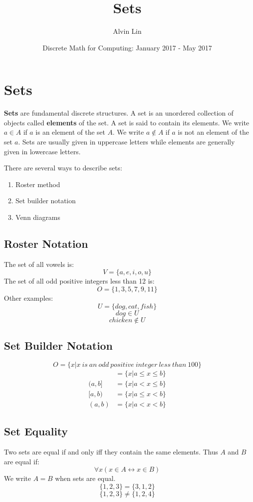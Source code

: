 \documentclass[letterpaper, 12pt]{math}
\title{Sets}
\author{Alvin Lin}
\date{Discrete Math for Computing: January 2017 - May 2017}
\begin{document}
\maketitle

\section*{Sets}
\textbf{Sets} are fundamental discrete structures. A set is an unordered
collection of objects called \textbf{elements} of the set. A set is said
to contain its elements. We write \( a \in A \) if \( a \) is an element of the
set \( A \). We write \( a \notin A \) if \( a \) is not an element of the set
\( a \). Sets are usually given in uppercase letters while elements are
generally given in lowercase letters. \par
There are several ways to describe sets:
\begin{enumerate}
  \item Roster method
  \item Set builder notation
  \item Venn diagrams
\end{enumerate}

\subsection*{Roster Notation}
The set of all vowels is:
\[ V = \bigg\{a,e,i,o,u\bigg\} \]
The set of all odd positive integers less than 12 is:
\[ O = \bigg\{1,3,5,7,9,11\bigg\} \]
Other examples:
\[ U = \bigg\{dog,cat,fish\bigg\} \]
\[ dog \in U \]
\[ chicken \notin U \]

\subsection*{Set Builder Notation}
\[ O = \bigg\{x|x\ is\ an\ odd\ positive\ integer\ less\ than\ 100\bigg\} \]
\begin{align*}
  [a,b] &= \bigg\{x|a \leq x \leq b \bigg\} \\
  (a,b] &= \bigg\{x|a < x \leq b \bigg\} \\
  [a,b) &= \bigg\{x|a \leq x < b \bigg\} \\
  (a,b) &= \bigg\{x|a < x < b \bigg\}
\end{align*}

\subsection*{Set Equality}
Two sets are equal if and only iff they contain the same elements. Thus \( A \)
and \( B \) are equal if:
\[ \forall{x}(x \in A \leftrightarrow x \in B) \]
We write \( A = B \) when sets are equal.
\[ \bigg\{1,2,3\bigg\} = \bigg\{3,1,2\bigg\} \]
\[ \bigg\{1,2,3\bigg\} \neq \bigg\{1,2,4\bigg\} \]
\end{document}
